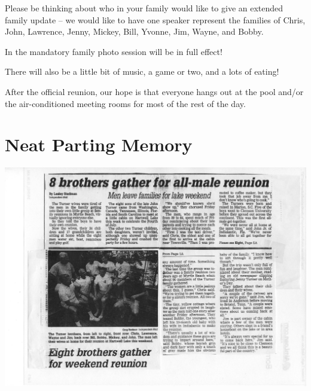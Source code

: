 \documentclass[
]{book}
\begin{document}
Please be thinking about who in your family would like to give an extended family update -- we would like to have one speaker represent the families of Chris, John, Lawrence, Jenny, Mickey, Bill, Yvonne, Jim, Wayne, and Bobby.

In the mandatory family photo session will be in full effect!

There will also be a little bit of music, a game or two, and a lots of eating!

After the official reunion, our hope is that everyone hangs out at the pool and/or the air-conditioned meeting rooms for most of the rest of the day.

\hypertarget{neat-parting-memory}{%
\section*{Neat Parting Memory}\label{neat-parting-memory}}

\includegraphics[width=1\linewidth]{images/brothers}
\end{document}
